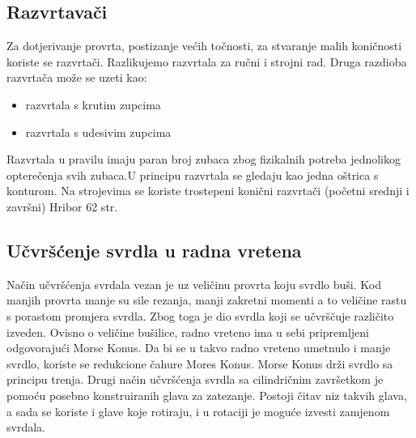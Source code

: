 \documentclass[a4paper,12pt]{article}
\numberwithin{figure}{section}
\begin{document}
\subsection{Razvrtavači}
Za dotjerivanje provrta, postizanje većih točnosti, za stvaranje malih koničnosti koriste se razvrtači. Razlikujemo razvrtala za ručni i strojni rad. Druga razdioba razvrtača može se  uzeti kao:
\begin{itemize}
\item razvrtala s krutim zupcima
\item razvrtala s udesivim zupcima
\end{itemize}
Razvrtala u pravilu imaju paran broj zubaca zbog fizikalnih potreba jednolikog opterečenja svih zubaca.U principu razvrtala se gledaju kao jedna oštrica s konturom.
Na strojevima se koriste trostepeni konični razvrtači (početni srednji i završni) Hribor 62 str.
\subsection{Učvršćenje svrdla u radna vretena}
Način učvršćenja svrdala vezan je uz veličinu provrta koju svrdlo buši. Kod manjih provrta manje su sile rezanja, manji zakretni momenti a to veličine rastu s porastom promjera svrdla. Zbog toga je dio svrdla koji se učvrščuje različito izveden.
Ovisno o veličine bušilice, radno vreteno ima u sebi pripremljeni odgovorajući Morse Konus. Da bi se u takvo radno vreteno umetnulo i manje svrdlo, koriste se redukcione čahure Mores Konus. Morse Konus drži svrdlo sa principu trenja. Drugi način učvršćenja svrdla sa cilindričnim završetkom je pomoću posebno konstruiranih glava za zatezanje. Postoji čitav niz takvih glava, a sada se koriste i glave koje rotiraju, i u rotaciji je moguće izvesti zamjenom svrdala.
\end{document}
